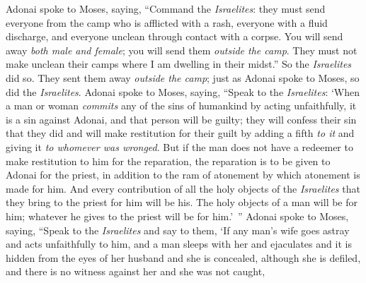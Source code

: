 \begin{biblechapter} %
 Adonai spoke to Moses, saying,
\verse “Command the \textit{Israelites}: they must send everyone from the camp who is afflicted with a rash, everyone with a fluid discharge, and everyone unclean through contact with a corpse.
\verse You will send away \textit{both male and female}; you will send them \textit{outside the camp}. They must not make unclean their camps where I am dwelling in their midst.”
\verse So the \textit{Israelites} did so. They sent them away \textit{outside the camp}; just as Adonai spoke to Moses, so did the \textit{Israelites}.
 Adonai spoke to Moses, saying,
\verse “Speak to the \textit{Israelites}: ‘When a man or woman \textit{commits} any of the sins of humankind by acting unfaithfully, it is a sin against Adonai, and that person will be guilty;
\verse they will confess their sin that they did and will make restitution for their guilt by adding a fifth \textit{to it} and giving it \textit{to whomever was wronged}.
\verse But if the man does not have a redeemer to make restitution to him for the reparation, the reparation is to be given to Adonai for the priest, in addition to the ram of atonement by which atonement is made for him.
\verse And every contribution of all the holy objects of the \textit{Israelites} that they bring to the priest for him will be his.
\verse The holy objects of a man will be for him; whatever he gives to the priest will be for him.’ ”
 Adonai spoke to Moses, saying,
\verse “Speak to the \textit{Israelites} and say to them, ‘If any man’s wife goes astray and acts unfaithfully to him,
\verse and a man sleeps with her and ejaculates and it is hidden from the eyes of her husband and she is concealed, although she is defiled, and there is no witness against her and she was not caught,

\end{biblechapter}
